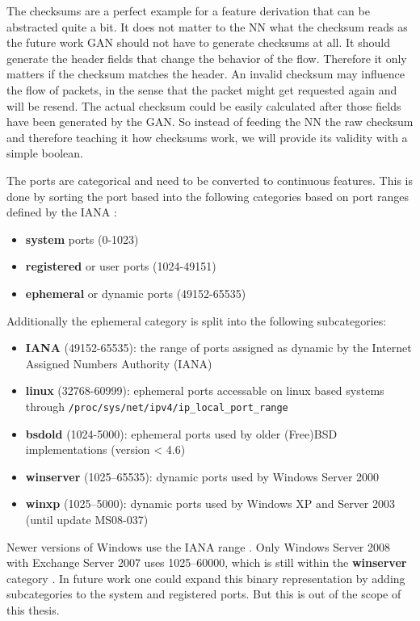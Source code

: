 \documentclass[
	ngerman,
	ruledheaders=section,%
	class=report,%
	thesis={type=bachelor},%
	accentcolor=9c,%
	custommargins=true,%
	marginpar=false,%
	parskip=half-,%
	fontsize=11pt,%
]{tudapub}
\let\code\texttt
\begin{document}
The checksums are a perfect example for a feature derivation that can be abstracted quite a bit.
It does not matter to the NN what the checksum reads as the future work GAN should not have to generate checksums at all.
It should generate the header fields that change the behavior of the flow.
Therefore it only matters if the checksum matches the header.
An invalid checksum may influence the flow of packets, in the sense that the packet might get requested again and will be resend.
The actual checksum could be easily calculated after those fields have been generated by the GAN.
So instead of feeding the NN the raw checksum and therefore teaching it how checksums work, we will provide its validity with a simple boolean.

The ports are categorical and need to be converted to continuous features.
This is done by sorting the port based into the following categories based on port ranges defined by the IANA \cite{ServiceNameTransport}:
\begin{itemize}
    \item \textbf{system} ports (0-1023)
    \item \textbf{registered} or user ports (1024-49151)
    \item \textbf{ephemeral} or dynamic ports (49152-65535)
\end{itemize}
Additionally the ephemeral category is split into the following subcategories:
\begin{itemize}
    \item \textbf{IANA} (49152-65535): the range of ports assigned as dynamic by the Internet Assigned Numbers Authority (IANA) \cite{ServiceNameTransport}
    \item \textbf{linux} (32768-60999): ephemeral ports accessable on linux based systems through \code{/proc/sys/net/ipv4/ip\_local\_port\_range}
    \item \textbf{bsdold} (1024-5000): ephemeral ports used by older (Free)BSD implementations (version < 4.6) \cite{EphemeralPortRange}
    \item \textbf{winserver} (1025–65535): dynamic ports used by Windows Server 2000 \cite{DefaultDynamicPort} \cite{WhenYouTry}
    \item \textbf{winxp} (1025–5000): dynamic ports used by Windows XP \cite{CableGuyDecember} and Server 2003 (until update MS08-037) \cite{YouExperienceIssues}
\end{itemize}
Newer versions of Windows use the IANA range \cite{DefaultDynamicPort}.
Only Windows Server 2008 with Exchange Server 2007 uses 1025–60000, which is still within the \textbf{winserver} category \cite{DefaultDynamicPort}.
In future work one could expand this binary representation by adding subcategories to the system and registered ports.
But this is out of the scope of this thesis.
\end{document}
